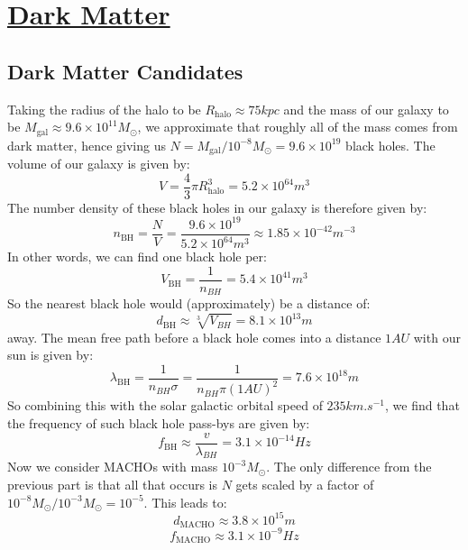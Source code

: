 \section[Dark Matter]{\hyperlink{toc}{Dark Matter}}

\subsection{Dark Matter Candidates}
Taking the radius of the halo to be $R_{\text{halo}} \approx 75 \si{kpc}$ and the mass of our galaxy to be $M_{\text{gal}} \approx 9.6 \times 10^{11} M_\odot$, we approximate that roughly all of the mass comes from dark matter, hence giving us $N = M_{\text{gal}}/10^{-8}M_\odot = 9.6 \times 10^{19}$ black holes. The volume of our galaxy is given by:
\begin{equation}
    V = \frac{4}{3}\pi R_{\text{halo}}^3 = 5.2 \times 10^{64}\si{m^3}
\end{equation}
The number density of these black holes in our galaxy is therefore given by:
\begin{equation}
    n_{\text{BH}} = \frac{N}{V} = \frac{9.6 \times 10^{19}}{5.2 \times 10^{64}\si{m^3}} \approx 1.85 \times 10^{-42} \si{m^{-3}}
\end{equation}
In other words, we can find one black hole per:
\begin{equation}
    V_{\text{BH}} = \frac{1}{n_{BH}} = 5.4 \times 10^{41}\si{m^3}
\end{equation}
So the nearest black hole would (approximately) be a distance of:
\begin{equation}
    \boxed{d_{\text{BH}} \approx \sqrt[3]{V_{BH}} = 8.1 \times 10^{13}\si{m}}
\end{equation}
away. The mean free path before a black hole comes into a distance $1 \si{AU}$ with our sun is given by:
\begin{equation}
    \lambda_{\text{BH}} = \frac{1}{n_{BH}\sigma} = \frac{1}{n_{BH}\pi (1 \si{AU})^2} = 7.6 \times 10^{18}\si{m}
\end{equation}
So combining this with the solar galactic orbital speed of $235 \si{km.s^{-1}}$, we find that the frequency of such black hole pass-bys are given by:
\begin{equation}
    \boxed{f_{\text{BH}} \approx \frac{v}{\lambda_{BH}} = 3.1 \times 10^{-14} \si{Hz}}
\end{equation}
Now we consider MACHOs with mass $10^{-3}M_\odot$. The only difference from the previous part is that all that occurs is $N$ gets scaled by a factor of $10^{-8}M_\odot/10^{-3}M_\odot = 10^{-5}$. This leads to:
\begin{equation}
    \boxed{d_{\text{MACHO}} \approx 3.8 \times 10^{15}\si{m}}
\end{equation}
\begin{equation}
    \boxed{f_{\text{MACHO}} \approx 3.1 \times 10^{-9}\si{Hz}}
\end{equation}

